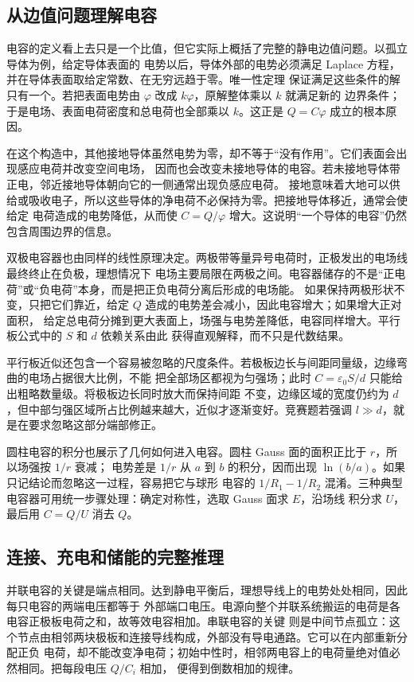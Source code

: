 \subsection*{从边值问题理解电容}

电容的定义看上去只是一个比值，但它实际上概括了完整的静电边值问题。以孤立导体为例，给定导体表面的
电势以后，导体外部的电势必须满足 Laplace 方程，并在导体表面取给定常数、在无穷远趋于零。唯一性定理
保证满足这些条件的解只有一个。若把表面电势由 $\varphi$ 改成 $k\varphi$，原解整体乘以 $k$ 就满足新的
边界条件；于是电场、表面电荷密度和总电荷也全部乘以 $k$。这正是 $Q=C\varphi$ 成立的根本原因。

在这个构造中，其他接地导体虽然电势为零，却不等于“没有作用”。它们表面会出现感应电荷并改变空间电场，
因而也会改变未接地导体的电容。若未接地导体带正电，邻近接地导体朝向它的一侧通常出现负感应电荷。
接地意味着大地可以供给或吸收电子，所以这些导体的净电荷不必保持为零。把接地导体移近，通常会使给定
电荷造成的电势降低，从而使 $C=Q/\varphi$ 增大。这说明“一个导体的电容”仍然包含周围边界的信息。

双极电容器也由同样的线性原理决定。两极带等量异号电荷时，正极发出的电场线最终终止在负极，理想情况下
电场主要局限在两极之间。电容器储存的不是“正电荷”或“负电荷”本身，而是把正负电荷分离后形成的电场能。
如果保持两极形状不变，只把它们靠近，给定 $Q$ 造成的电势差会减小，因此电容增大；如果增大正对面积，
给定总电荷分摊到更大表面上，场强与电势差降低，电容同样增大。平行板公式中的 $S$ 和 $d$ 依赖关系由此
获得直观解释，而不只是代数结果。

平行板近似还包含一个容易被忽略的尺度条件。若极板边长与间距同量级，边缘弯曲的电场占据很大比例，不能
把全部场区都视为匀强场；此时 $C=\varepsilon_0S/d$ 只能给出粗略数量级。将极板边长同时放大而保持间距
不变，边缘区域的宽度仍约为 $d$，但中部匀强区域所占比例越来越大，近似才逐渐变好。竞赛题若强调
$l\gg d$，就是在要求忽略这部分端部修正。

圆柱电容的积分也展示了几何如何进入电容。圆柱 Gauss 面的面积正比于 $r$，所以场强按 $1/r$ 衰减；
电势差是 $1/r$ 从 $a$ 到 $b$ 的积分，因而出现 $\ln(b/a)$。如果只记结论而忽略这一过程，容易把它与球形
电容的 $1/R_1-1/R_2$ 混淆。三种典型电容器可用统一步骤处理：确定对称性，选取 Gauss 面求 $E$，沿场线
积分求 $U$，最后用 $C=Q/U$ 消去 $Q$。

\subsection*{连接、充电和储能的完整推理}

并联电容的关键是端点相同。达到静电平衡后，理想导线上的电势处处相同，因此每只电容的两端电压都等于
外部端口电压。电源向整个并联系统搬运的电荷是各电容正极板电荷之和，故等效电容相加。串联电容的关键
则是中间节点孤立：这个节点由相邻两块极板和连接导线构成，外部没有导电通路。它可以在内部重新分配正负
电荷，却不能改变净电荷；初始中性时，相邻两电容上的电荷量绝对值必然相同。把每段电压 $Q/C_i$ 相加，
便得到倒数相加的规律。

